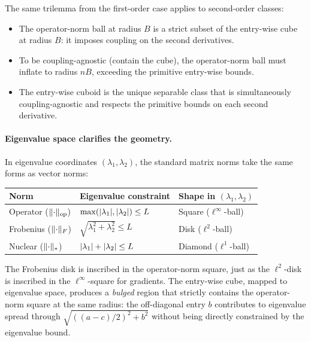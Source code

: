 The same trilemma from the first-order case applies to second-order classes:
\begin{itemize}
	\item The operator-norm ball at radius $B$ is a strict subset of the entry-wise cube at radius $B$: it imposes coupling on the second derivatives.
	\item To be coupling-agnostic (contain the cube), the operator-norm ball must inflate to radius $nB$, exceeding the primitive entry-wise bounds.
	\item The entry-wise cuboid is the unique separable class that is simultaneously coupling-agnostic and respects the primitive bounds on each second derivative.
\end{itemize}

\paragraph{Eigenvalue space clarifies the geometry.}
In eigenvalue coordinates $(\lambda_1, \lambda_2)$, the standard matrix norms take the same forms as vector norms:
\begin{center}
\begin{tabular}{lll}
	Norm & Eigenvalue constraint & Shape in $(\lambda_1, \lambda_2)$ \\
	\hline
	Operator ($\lVert\cdot\rVert_{\mathrm{op}}$) & $\max(\lvert\lambda_1\rvert, \lvert\lambda_2\rvert) \leq L$ & Square ($\ell^\infty$-ball) \\
	Frobenius ($\lVert\cdot\rVert_F$) & $\sqrt{\lambda_1^2 + \lambda_2^2} \leq L$ & Disk ($\ell^2$-ball) \\
	Nuclear ($\lVert\cdot\rVert_*$) & $\lvert\lambda_1\rvert + \lvert\lambda_2\rvert \leq L$ & Diamond ($\ell^1$-ball)
\end{tabular}
\end{center}
The Frobenius disk is inscribed in the operator-norm square, just as the $\ell^2$-disk is inscribed in the $\ell^\infty$-square for gradients.
The entry-wise cube, mapped to eigenvalue space, produces a \emph{bulged} region that strictly contains the operator-norm square at the same radius: the off-diagonal entry $b$ contributes to eigenvalue spread through $\sqrt{((a-c)/2)^2 + b^2}$ without being directly constrained by the eigenvalue bound.

